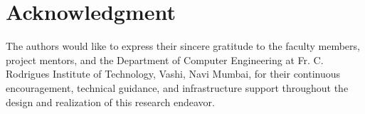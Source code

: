 \documentclass[conference]{IEEEtran}
\begin{document}
\section*{Acknowledgment}

The authors would like to express their sincere gratitude to the faculty members, project mentors, and the Department of Computer Engineering at Fr. C. Rodrigues Institute of Technology, Vashi, Navi Mumbai, for their continuous encouragement, technical guidance, and infrastructure support throughout the design and realization of this research endeavor.

\end{document}
